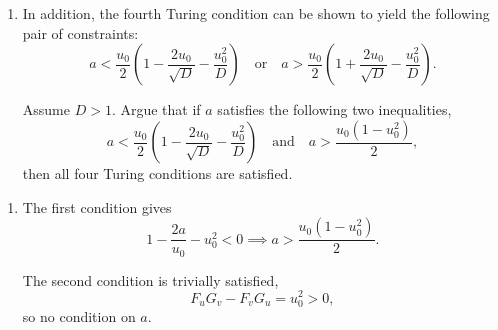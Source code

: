 \documentclass[a4paper, 12pt]{article}
\begin{document}
\begin{enumerate}[label={\bf \arabic{*}.\;}, ref={\arabic{*}},itemsep=3ex, left=0ex]
{\begin{enumerate}[label=(\alph*)]
{              Find conditions on $a$ such that the first three Turing conditions, \cref{turingconditions4}, are satisfied.
            }
          \item{In addition, the fourth Turing condition can be shown to yield the following pair of constraints:
              \begin{equation}
                a< \frac{u_0}{2}\left(1-\frac{2u_0}{\sqrt{D}} -\frac{u_0^2}{D}\right) \quad \text{or} \quad a> \frac{u_0}{2}\left(1+\frac{2u_0}{\sqrt{D}} -\frac{u_0^2}{D}\right).
              \end{equation}

              Assume $D>1$. Argue that if $a$ satisfies the following two inequalities,
              \begin{equation}
                a<  \frac{u_0}{2}\left(1-\frac{2u_0}{\sqrt{D}} -\frac{u_0^2}{D}\right) \quad \text{and} \quad a>  \frac{u_0(1-u_0^2)}{2},
              \end{equation}
              then all four Turing  conditions are satisfied.
            }
        \end{enumerate}
      }
      {
        \begin{enumerate}[label=(\alph*)]
          \item{
              The first condition gives
              \begin{equation}
                \label{acon}
                1-\frac{2a}{u_0} - u_0^2<0 \implies a> \frac{u_0(1-u_0^2)}{2}.
              \end{equation}

              The second condition is trivially satisfied,
              \begin{equation}
                F_uG_v -F_vG_u = u_0^2>0,
              \end{equation}
              so no condition on $a$.

}
\end{enumerate}}
\end{enumerate}
\end{document}
